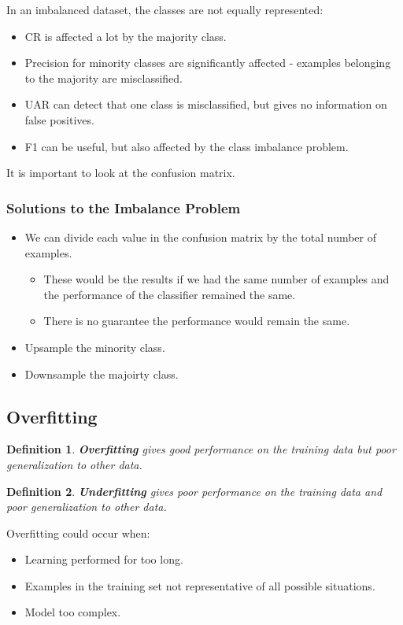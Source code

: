 \documentclass[11pt]{article}
\newtheorem{defn}{Definition}
\begin{document}
In an imbalanced dataset, the classes are not equally represented:
\begin{itemize}
  \item CR is affected a lot by the majority class.
  \item Precision for minority classes are significantly affected - examples belonging to the majority are misclassified.
  \item UAR can detect that one class is misclassified, but gives no information on false positives.
  \item F1 can be useful, but also affected by the class imbalance problem.
\end{itemize}

It is important to look at the confusion matrix.

\subsubsection{Solutions to the Imbalance Problem}
\begin{itemize}
  \item We can divide each value in the confusion matrix by the total number of examples.
    \begin{itemize}
      \item These would be the results if we had the same number of examples and the performance of the classifier remained the same.
      \item There is no guarantee the performance would remain the same.
    \end{itemize}
  \item Upsample the minority class.
  \item Downsample the majoirty class.
\end{itemize}

\subsection{Overfitting}
\begin{defn}
  \textbf{Overfitting} gives good performance on the training data but poor generalization to other data.
\end{defn}

\begin{defn}
  \textbf{Underfitting} gives poor performance on the training data and poor generalization to other data.
\end{defn}

Overfitting could occur when:
\begin{itemize}
  \item Learning performed for too long.
  \item Examples in the training set not representative of all possible situations.
  \item Model too complex.
\end{itemize}
\end{document}
